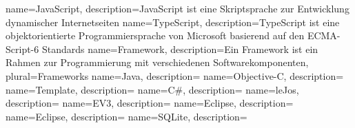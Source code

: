 
{
	name=JavaScript,
	description={JavaScript ist eine Skriptsprache zur Entwicklung dynamischer Internetseiten}
}
{
	name=TypeScript,
	description={TypeScript ist eine objektorientierte Programmiersprache von Microsoft basierend auf den ECMA-Script-6 Standards}
}
{
	name=Framework,
	description={Ein Framework ist ein Rahmen zur Programmierung mit verschiedenen Softwarekomponenten},
	plural=Frameworks
}
{
	name=Java,
	description={}
}
{
	name=Objective-C,
	description={}
}
{
	name=Template,
	description={}
}
{
	name=C\#,
	description={}
}
{
	name=leJos,
	description={}
}
{
	name=EV3,
	description={}
}
{
	name=Eclipse,
	description={}
}
{
	name=Eclipse,
	description={}
}
{
	name=SQLite,
	description={}
}

